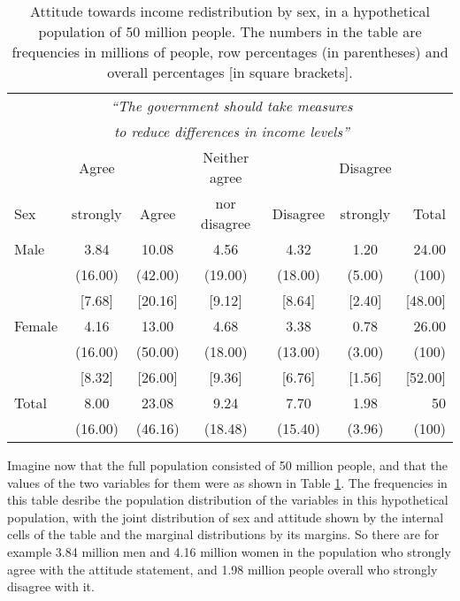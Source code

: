 \begin{table}
\caption{Attitude towards income redistribution by sex, in a hypothetical
population of 50 million people. The numbers in the table are
frequencies in millions of people, row percentages (in parentheses) and
overall percentages [in square brackets].}
\label{t_sex_attitude_pop}
\begin{center}
\begin{tabular}{|l|ccccc|r|}\hline
& \multicolumn{5}{|c|}{\emph{``The government should
take measures}} & \\
& \multicolumn{5}{|c|}{\emph{to reduce differences in income levels''}}
& \\[.3ex]
 & Agree & & Neither agree & & Disagree & \\
Sex & strongly & Agree & nor disagree & Disagree & strongly & Total \\ \hline
Male & 3.84 & 10.08 & 4.56 & 4.32 & 1.20  &  24.00\\
& (16.00) & (42.00) &(19.00) & (18.00) & (5.00) & (100) \\
& [7.68] & [20.16] & [9.12] & [8.64] & [2.40] & [48.00] \\[.5ex]
Female & 4.16 & 13.00 & 4.68 & 3.38 & 0.78 & 26.00\\
& (16.00) & (50.00) & (18.00) & (13.00) & (3.00) & (100)\\
& [8.32] & [26.00] & [9.36] & [6.76] & [1.56] & [52.00] \\
\hline
Total & 8.00 & 23.08 &  9.24&  7.70& 1.98 & 50 \\
      & (16.00) & (46.16) & (18.48) & (15.40) & (3.96) & (100) \\
\hline
\end{tabular}
\end{center}
\vspace*{-3ex}
\end{table}

Imagine now that the full population consisted of 50 million people, and
that the values of the two variables for them were as shown in Table
\ref{t_sex_attitude_pop}. The frequencies in this table desribe the
population distribution of the variables in this hypothetical
population, with the joint distribution of sex and attitude shown by the
internal cells of the table and the marginal distributions by its
margins. So there are for example 3.84 million men and 4.16 million
women in the population who strongly agree with the attitude statement,
and 1.98 million people overall who strongly
disagree with it.

